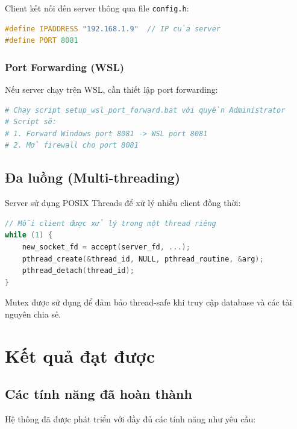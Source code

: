 ﻿\documentclass[12pt,a4paper]{report}
\begin{document}
Client kết nối đến server thông qua file \texttt{config.h}:

\begin{lstlisting}[language=C++]
#define IPADDRESS "192.168.1.9"  // IP của server
#define PORT 8081
\end{lstlisting}

\subsection{Port Forwarding (WSL)}

Nếu server chạy trên WSL, cần thiết lập port forwarding:

\begin{lstlisting}[language=bash]
# Chạy script setup_wsl_port_forward.bat với quyền Administrator
# Script sẽ:
# 1. Forward Windows port 8081 -> WSL port 8081
# 2. Mở firewall cho port 8081
\end{lstlisting}

\section{Đa luồng (Multi-threading)}

Server sử dụng POSIX Threads để xử lý nhiều client đồng thời:

\begin{lstlisting}[language=C]
// Mỗi client được xử lý trong một thread riêng
while (1) {
    new_socket_fd = accept(server_fd, ...);
    pthread_create(&thread_id, NULL, pthread_routine, &arg);
    pthread_detach(thread_id);
}
\end{lstlisting}

Mutex được sử dụng để đảm bảo thread-safe khi truy cập database và các tài nguyên chia sẻ.

\chapter{Kết quả đạt được}

\section{Các tính năng đã hoàn thành}

Hệ thống đã được phát triển với đầy đủ các tính năng như yêu cầu:
\end{document}

